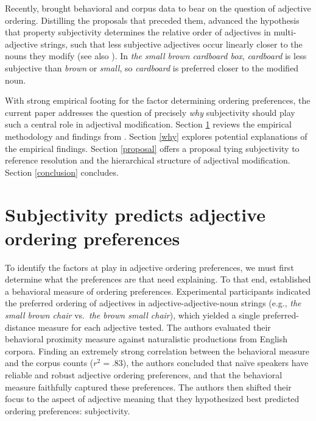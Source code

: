 \documentclass{sp}
\begin{document}
Recently, \cite{scontrasetal2017adjectives} brought behavioral and corpus data to bear on the question of adjective ordering. Distilling the proposals that preceded them, \citeauthor{scontrasetal2017adjectives} advanced the hypothesis that property subjectivity determines the relative order of adjectives in multi-adjective strings, such that less subjective adjectives occur linearly closer to the nouns they modify (see also \citealp{hetzron1978,tucker1998,hill2012}). In \emph{the small brown cardboard box}, \emph{cardboard} is less subjective than \emph{brown} or \emph{small}, so \emph{cardboard} is preferred closer to the modified noun.



With strong empirical footing for the factor determining ordering preferences, the current paper addresses the question of precisely \emph{why} subjectivity should play such a central role in adjectival modification. Section \ref{review} reviews the empirical methodology and findings from \cite{scontrasetal2017adjectives}. Section \ref{why} explores potential explanations of the empirical findings. Section \ref{proposal} offers a proposal tying subjectivity to reference resolution and the hierarchical structure of adjectival modification. Section \ref{conclusion} concludes.


\section{Subjectivity predicts adjective ordering preferences} \label{review}

To identify the factors at play in adjective ordering preferences, we must first determine what the preferences are that need explaining. To that end, \cite{scontrasetal2017adjectives} established a behavioral measure of ordering preferences. Experimental participants indicated the preferred ordering of adjectives in adjective-adjective-noun strings (e.g., \emph{the small brown chair} vs.~\emph{the brown small chair}), which yielded a single preferred-distance measure for each adjective tested.
The authors evaluated their behavioral proximity measure against naturalistic productions from English corpora. Finding an extremely strong correlation between the behavioral measure and the corpus counts ($r^2 = .83$), the authors concluded that na\"ive speakers have reliable and robust adjective ordering preferences, and that the behavioral measure faithfully captured these preferences. The authors then shifted their focus to the aspect of adjective meaning that they hypothesized best predicted ordering preferences: subjectivity. 
\end{document}
